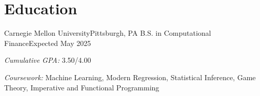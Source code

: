 \section{Education}
\resumeSectionStart

    \resumeSubheading
        {Carnegie Mellon University}{Pittsburgh, PA}
        {B.S. in Computational Finance}{Expected May 2025}
    
    \resumeItemListStart
        \item \textit{Cumulative GPA:} 3.50/4.00
        \item \textit{Coursework:} Machine Learning, Modern Regression, Statistical Inference, Game Theory, Imperative and Functional Programming
    \resumeItemListEnd

\resumeSectionEnd
